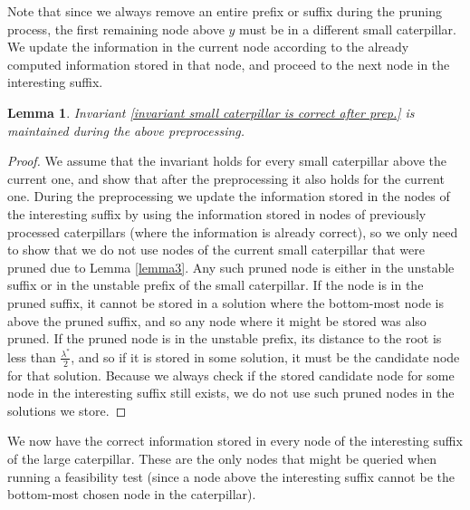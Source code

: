\documentclass[11pt,a4paper]{article}
\newcounter{mycounter}
\newenvironment{noindlist}
 {\begin{list}{\arabic{mycounter}.~~}{\usecounter{mycounter} \labelsep=0em \labelwidth=0em \leftmargin=0em \itemindent=0em}}
 {\end{list}}
\newtheorem{lemma}{Lemma}
\theoremstyle{definition}
\theoremstyle{remark}
\begin{document}
\begin{noindlist}
\begin{itemize}
\end{itemize}

Note that since we always remove an entire prefix or suffix during the pruning process, the first remaining node above $y$ must be in a different small caterpillar. We update the information in the current node according to the already computed information stored in that node, and proceed to the next node in the interesting suffix.



\end{noindlist}

\begin{lemma}
Invariant \ref{invariant small caterpillar is correct after prep.} is maintained during the above preprocessing.
\end{lemma}
\begin{proof}
We assume that the invariant holds for every small caterpillar above the current one, and show that after the preprocessing it also holds for the current one. During the preprocessing we update the information stored in the nodes of the interesting suffix by using the information stored in nodes of previously processed caterpillars (where the information is already correct), so we only need to show that we do not use nodes of the current small caterpillar that were pruned due to Lemma \ref{lemma3}. Any such pruned node is either in the unstable suffix or in the unstable prefix of the small caterpillar. If the node is in the pruned suffix, it cannot be stored in a solution where the bottom-most node is above the pruned suffix, and so any node where it might be stored was also pruned. If the pruned node is in the unstable prefix, its distance to the root is less than $\frac{\lambda^*}{2}$, and so if it is stored in some solution, it must be the candidate node for that solution. Because we always check if the stored candidate node for some node in the interesting suffix still exists, we do not use such pruned nodes in the solutions we store.
\end{proof}

We now have the correct information stored in every node of the interesting suffix of the large caterpillar. These are the only nodes that might be queried when running a feasibility test (since a node above the interesting suffix cannot be the bottom-most chosen node in the caterpillar).
\end{document}
